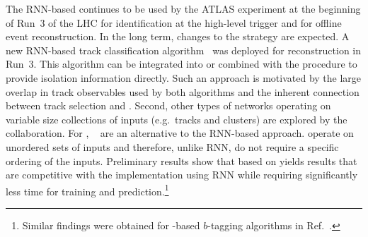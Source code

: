 The RNN-based \tauid continues to be used by the ATLAS experiment at
the beginning of Run~3 of the LHC for identification at the high-level
trigger and for offline event reconstruction. In the long term, changes to the \tauid
strategy are expected. A new RNN-based \tauhadvis track classification
algorithm~\cite{Maerker:2021hro} was deployed for \tauhadvis
reconstruction in Run~3. This algorithm can be
integrated into or combined with the \tauid procedure to provide
isolation information directly. Such an approach is motivated by the
large overlap in track observables used by both algorithms and the
inherent connection between \tauhadvis track selection and
\tauid. Second, other types of networks operating on variable size
collections of inputs (e.g.\ tracks and clusters) are explored by the
collaboration. For \tauid, \deepsets~\cite{NIPS2017_f22e4747} are an
alternative to the RNN-based approach. \deepsets operate on unordered
sets of inputs and therefore, unlike RNN, do not require a specific
ordering of the inputs. Preliminary results show that \tauid based on
\deepsets yields results that are competitive with the implementation
using RNN while requiring significantly less time for training and
prediction.\footnote{Similar findings were obtained for
  \deepsets-based $b$-tagging algorithms in
  Ref.~\cite{ATL-PHYS-PUB-2020-014}.}




